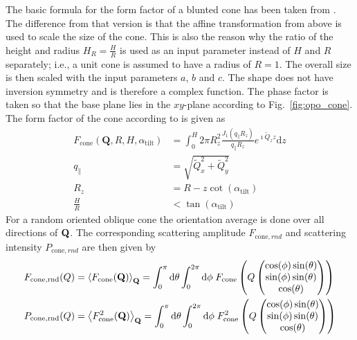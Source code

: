 The basic formula for the form factor of a blunted cone has been taken from \cite{Renaud2009}. The difference from that version is that the affine transformation from above is used to scale the size of the cone. This is also the reason why the ratio of the height and radius $H_R=\frac{H}{R}$ is used as an input parameter instead of $H$ and $R$ separately; i.e., a unit cone is assumed to have a radius of $R=1$. The overall size is then scaled with the input parameters $a$, $b$ and $c$. The shape does not have inversion symmetry and is therefore a complex function. The phase factor is taken so that the base plane lies in the $xy$-plane according to Fig.\ \ref{fig:opo_cone}. The form factor of the cone according to \cite{Renaud2009} is given as
\begin{align}\label{eq:opo_cone}
  F_\mathrm{cone}(\mathbf{Q},R,H,\alpha_\mathrm{tilt}) & = \int_0^H2\pi R_z^2 \frac{J_1\left(q_\parallel R_z\right)}{q_\parallel R_z}  e^{\imath \tilde{Q}_z z} \mathrm{d}z\\
  q_\parallel &= \sqrt{\tilde{Q}_x^2+\tilde{Q}_y^2} \\
  R_z &=R-z\cot(\alpha_\mathrm{tilt}) \\
  \frac{H}{R} &< \tan(\alpha_\mathrm{tilt})
\end{align}
For a random oriented oblique cone the orientation average is done over all directions of ${\bf Q}$. The corresponding scattering amplitude $F_{\mathrm{cone},rnd}$ and scattering intensity $P_{\mathrm{cone},rnd}$ are then given by
\begin{align}
F_{\mathrm{cone,rnd}}(Q) &= \left\langle F_\mathrm{cone}({\bf Q})\right\rangle_{\bf Q} = \int_0^\pi\mathrm{d}\theta \int_0^{2\pi}\mathrm{d}\phi \; F_\mathrm{cone}\left(Q\begin{pmatrix}
                                       \cos(\phi)\sin(\theta) \\
                                       \sin(\phi)\sin(\theta) \\
                                       \cos(\theta)
                                     \end{pmatrix}\right) \\
P_{\mathrm{cone,rnd}}(Q) &= \left\langle F_\mathrm{cone}^2({\bf Q})\right\rangle_{\bf Q} = \int_0^\pi\mathrm{d}\theta \int_0^{2\pi}\mathrm{d}\phi \; F_\mathrm{cone}^2\left(Q\begin{pmatrix}
                                       \cos(\phi)\sin(\theta) \\
                                       \sin(\phi)\sin(\theta) \\
                                       \cos(\theta)
                                     \end{pmatrix}\right)
\end{align}

